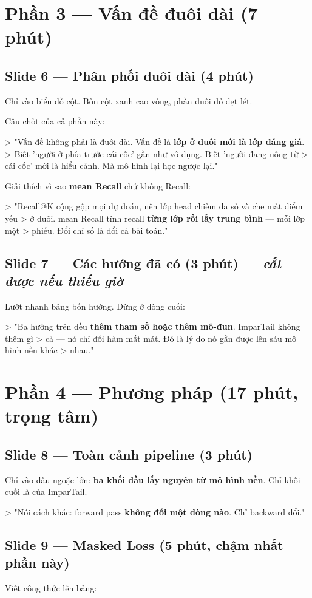 \documentclass[11pt,a4paper]{article}
\begin{document}
\section{Phần 3 --- Vấn đề đuôi dài (7 phút)}
\subsection{Slide 6 --- Phân phối đuôi dài (4 phút)}
Chỉ vào biểu đồ cột. Bốn cột xanh cao vống, phần đuôi đỏ dẹt lét.

Câu chốt của cả phần này:

> "Vấn đề không phải là đuôi dài. Vấn đề là \textbf{lớp ở đuôi mới là lớp đáng giá}. > Biết 'người ở phía trước cái cốc' gần như vô dụng. Biết 'người đang uống từ > cái cốc' mới là hiểu cảnh. Mà mô hình lại học ngược lại."

Giải thích vì sao \textbf{mean Recall} chứ không Recall:

> "Recall@K cộng gộp mọi dự đoán, nên lớp head chiếm đa số và che mất điểm yếu > ở đuôi. mean Recall tính recall \textbf{từng lớp rồi lấy trung bình} --- mỗi lớp một > phiếu. Đổi chỉ số là đổi cả bài toán."

\subsection{Slide 7 --- Các hướng đã có (3 phút) --- \emph{cắt được nếu thiếu giờ}}
Lướt nhanh bảng bốn hướng. Dừng ở dòng cuối:

> "Ba hướng trên đều \textbf{thêm tham số hoặc thêm mô-đun}. ImparTail không thêm gì > cả --- nó chỉ đổi hàm mất mát. Đó là lý do nó gắn được lên sáu mô hình nền khác > nhau."

\section{Phần 4 --- Phương pháp (17 phút, trọng tâm)}
\subsection{Slide 8 --- Toàn cảnh pipeline (3 phút)}
Chỉ vào dấu ngoặc lớn: \textbf{ba khối đầu lấy nguyên từ mô hình nền}. Chỉ khối cuối là của ImparTail.

> "Nói cách khác: forward pass \textbf{không đổi một dòng nào}. Chỉ backward đổi."

\subsection{Slide 9 --- Masked Loss (5 phút, chậm nhất phần này)}
Viết công thức lên bảng:
\end{document}
